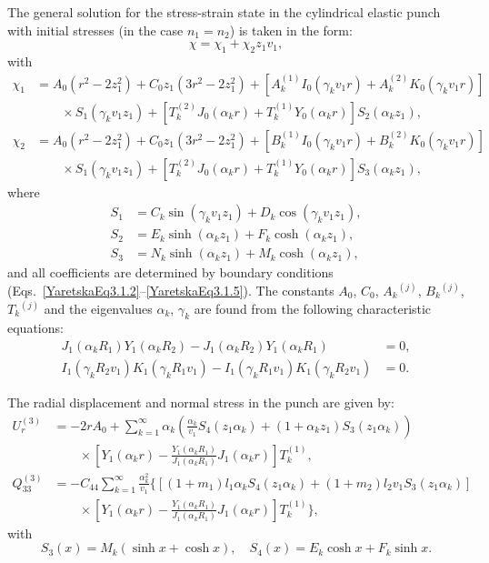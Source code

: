The general solution for the stress-strain state in the cylindrical elastic punch with initial stresses (in the case $n_1 = n_2$) is taken in the form:
\[
\chi = \chi_1 + \chi_2 z_1 v_1,
\]
with
\begin{align*}
	\chi_1 &= A_0 (r^2 - 2 z_1^2) + C_0 z_1 (3r^2 - 2 z_1^2) + \left[ A_k^{(1)} I_0(\gamma_k v_1 r) + A_k^{(2)} K_0(\gamma_k v_1 r) \right]  
	 \\
	&\qquad \times S_1(\gamma_k v_1 z_1) + \left[ T_k^{(2)} J_0(\alpha_k r) + T_k^{(1)} Y_0(\alpha_k r) \right] S_2(\alpha_k z_1), 
	 \\
	\chi_2 &= A_0 (r^2 - 2 z_1^2) + C_0 z_1 (3r^2 - 2 z_1^2) + \left[ B_k^{(1)} I_0(\gamma_k v_1 r) + B_k^{(2)} K_0(\gamma_k v_1 r) \right] 
	 \\
	&\qquad \times S_1(\gamma_k v_1 z_1)+ \left[ T_k^{(2)} J_0(\alpha_k r) + T_k^{(1)} Y_0(\alpha_k r) \right] S_3(\alpha_k z_1), 
\end{align*}
where
\[
\begin{aligned}
	S_1 &= C_k \sin(\gamma_k v_1 z_1) + D_k \cos(\gamma_k v_1 z_1), \\
	S_2 &= E_k \sinh(\alpha_k z_1) + F_k \cosh(\alpha_k z_1), \\
	S_3 &= N_k \sinh(\alpha_k z_1) + M_k \cosh(\alpha_k z_1),
\end{aligned}
\]
and all coefficients are determined by boundary conditions (Eqs.~\eqref{YaretskaEq3.1.2}–\eqref{YaretskaEq3.1.5}). The constants $A_0$, $C_0$, $A_k{}^{(j)}$, $B_k{}^{(j)}$, $T_k{}^{(j)}$ and the eigenvalues $\alpha_k$, $\gamma_k$ are found from the following characteristic equations:
\begin{align*}
	J_1(\alpha_k R_1) Y_1(\alpha_k R_2) - J_1(\alpha_k R_2) Y_1(\alpha_k R_1) &= 0,  \\
	I_1(\gamma_k R_2 v_1) K_1(\gamma_k R_1 v_1) - I_1(\gamma_k R_1 v_1) K_1(\gamma_k R_2 v_1) &= 0. 
\end{align*}

The radial displacement and normal stress in the punch are given by:
\begin{equation}\label{YaretskaEq3.2.2}
\begin{aligned}
	U^{(3)}_r &= -2r A_0 + \sum_{k=1}^\infty \alpha_k \left( \frac{\alpha_k}{v_1} S_4(z_1 \alpha_k) + (1 + \alpha_k z_1) S_3(z_1 \alpha_k) \right)
	\\
	&\qquad \times \left[ Y_1(\alpha_k r) - \frac{Y_1(\alpha_k R_1)}{J_1(\alpha_k R_1)} J_1(\alpha_k r) \right] T_k^{(1)}, 
	\\
	Q^{(3)}_{33} &= -C_{44} \sum_{k=1}^\infty \frac{\alpha_k^2}{v_1} \bigg\{ \left[ (1 + m_1) l_1 \alpha_k S_4(z_1 \alpha_k) + (1 + m_2) l_2 v_1 S_3(z_1 \alpha_k) \right] 
	 \\
	&\qquad \times \left[ Y_1(\alpha_k r) - \frac{Y_1(\alpha_k R_1)}{J_1(\alpha_k R_1)} J_1(\alpha_k r) \right] T_k^{(1)} \bigg\}, 
\end{aligned}
\end{equation}
with
\[
S_3(x) = M_k (\sinh x + \cosh x), \quad S_4(x) = E_k \cosh x + F_k \sinh x.
\]

